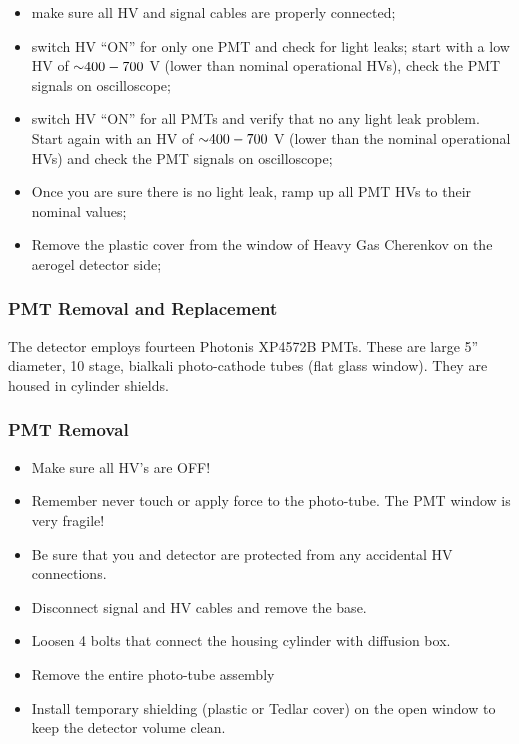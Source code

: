 {\begin{itemize}
\item make sure all HV and
  signal cables are properly connected;
\item switch HV ``ON'' for only one
  PMT and check for light leaks; start with a low HV of $\mathord{\sim} 400-700$ V
  (lower than nominal operational HVs), check the PMT signals on
  oscilloscope;
\item switch HV ``ON'' for all PMTs and verify that no any
  light leak problem. Start again with an HV of $\mathord{\sim} 400-700$ V (lower than
  the nominal operational HVs) and check the PMT signals on
  oscilloscope;
\item Once you are sure there is no light leak, ramp up all
  PMT HVs to their nominal values;
\item Remove the plastic cover from
  the window of Heavy Gas Cherenkov on the aerogel detector side;
\end{itemize}

\subsubsection{PMT Removal and Replacement}

The detector employs fourteen Photonis XP4572B PMTs. These are large
5'' diameter, 10 stage, bialkali photo-cathode tubes (flat glass
window). They are housed in cylinder shields.

\subsubsection*{PMT Removal}

\begin{itemize}
\item Make sure all HV’s are OFF!
\item Remember never touch or apply force to the photo-tube. The PMT
  window is very fragile!
\item Be sure that you and detector are
  protected from any accidental HV connections.
\item Disconnect signal
  and HV cables and remove the base.
\item Loosen 4 bolts that connect
  the housing cylinder with diffusion box.
\item Remove the entire
  photo-tube assembly
\item Install temporary shielding (plastic or Tedlar
  cover) on the open window to keep the detector volume clean.
\end{itemize}

}
